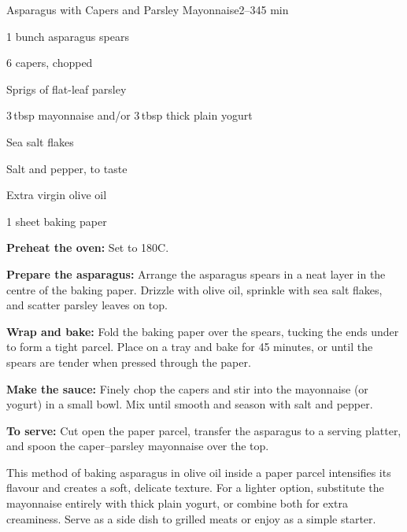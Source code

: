\begin{recipebox}{Asparagus with Capers and Parsley Mayonnaise}{2--3}{45 min}
  \begin{ingredients}
    \item 1 bunch asparagus spears
    \item 6 capers, chopped
    \item Sprigs of flat-leaf parsley
    \item 3\,tbsp mayonnaise and/or 3\,tbsp thick plain yogurt
    \item Sea salt flakes
    \item Salt and pepper, to taste
    \item Extra virgin olive oil
    \item 1 sheet baking paper
  \end{ingredients}

  \begin{method}
    \item \textbf{Preheat the oven:} Set to 180\degree C.
    \item \textbf{Prepare the asparagus:} Arrange the asparagus spears in a neat layer in the centre of the baking paper. Drizzle with olive oil, sprinkle with sea salt flakes, and scatter parsley leaves on top.
    \item \textbf{Wrap and bake:} Fold the baking paper over the spears, tucking the ends under to form a tight parcel. Place on a tray and bake for 45 minutes, or until the spears are tender when pressed through the paper.
    \item \textbf{Make the sauce:} Finely chop the capers and stir into the mayonnaise (or yogurt) in a small bowl. Mix until smooth and season with salt and pepper.
    \item \textbf{To serve:} Cut open the paper parcel, transfer the asparagus to a serving platter, and spoon the caper–parsley mayonnaise over the top.
  \end{method}

  \begin{notes}
    This method of baking asparagus in olive oil inside a paper parcel intensifies its flavour and creates a soft, delicate texture.  
    For a lighter option, substitute the mayonnaise entirely with thick plain yogurt, or combine both for extra creaminess.  
    Serve as a side dish to grilled meats or enjoy as a simple starter.
  \end{notes}
\end{recipebox}

